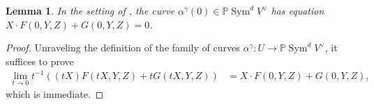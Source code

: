 \documentclass[12 pt, reqno]{amsart}
\newtheorem{lem}[thm]{Lemma}
\theoremstyle{definition}
\newcommand{\on}{\operatorname}
\newcommand{\mb}{\mathbb}
\renewcommand{\P}{\mb{P}}
\begin{document}
\begin{lem}
\label{line}
In the setting of , the curve
$\alpha^{\gamma}(0) \in \P \on{Sym}^{d}V^{\vee}$ has equation
$X \cdot F(0,Y,Z)+G(0,Y,Z) = 0$.

\end{lem}

\begin{proof}

 Unraveling the definition of the family of curves
 $\alpha^{\gamma}: U \to \P \on{Sym}^{d}V^{\vee}$, it suffices to
 prove
 \begin{align*}
   \lim_{t\to 0}t^{-1}((tX)F(tX,Y,Z)+tG(tX,Y,Z))&=X \cdot F(0,Y,Z)+G(0,Y,Z),
\end{align*}
which is immediate.

\end{proof}
\end{document}
